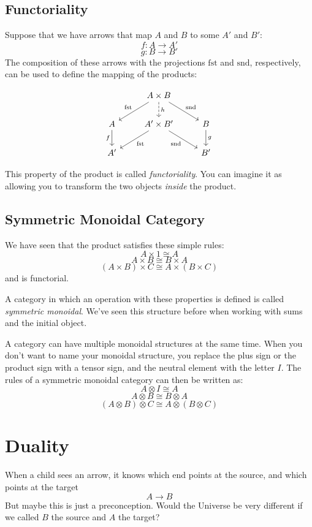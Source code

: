 \documentclass[DaoFP]{subfiles}
\begin{document}
\subsection{Functoriality}

Suppose that we have arrows that map $A$ and $B$ to some $A'$ and $B'$:
\[f \colon A \to A' \]
\[g \colon B \to B'\]
The composition of these arrows with the projections $\text{fst}$ and $\text{snd}$, respectively, can be used to define the mapping of the products:

\[
 \begin{tikzcd}
 & A \times B
\arrow[d, dashed, "h"]
 \arrow[dl,  "\text{fst}"']
 \arrow[dr,   "\text{snd}"]
\\
A
\arrow[d, "f"']
&A' \times B'
 \arrow[dl,  "\text{fst}"]
  \arrow[dr,   "\text{snd}"']
& B
\arrow[d, "g"]
\\
A' && B'
 \end{tikzcd}
\]

This property of the product is called \emph{functoriality}. You can imagine it as allowing you to transform the two objects \emph{inside} the product. 

\subsection{Symmetric Monoidal Category}

We have seen that the product satisfies these simple rules:
\[A \times 1 \cong A\]
\[A \times B \cong B \times A \]
\[(A \times B) \times C \cong A \times (B \times C) \]
and is functorial. 

A category in which an operation with these properties is defined is called \emph{symmetric monoidal}. We've seen this structure before when working with sums and the initial object. 

A category can have multiple monoidal structures at the same time. When you don't want to name your monoidal structure, you replace the plus sign or the product sign with a tensor sign, and the neutral element with the letter $I$. The rules of a symmetric monoidal category can then be written as:
\[A \otimes I \cong A\]
\[A \otimes B \cong B \otimes A \]
\[(A \otimes B) \otimes C \cong A \otimes (B \otimes C) \]

\section{Duality}

When a child sees an arrow, it knows which end points at the source, and which points at the target
\[A \to B \]
But maybe this is just a preconception. Would the Universe be very different if we called $B$ the source and $A$ the target? 
\end{document}
